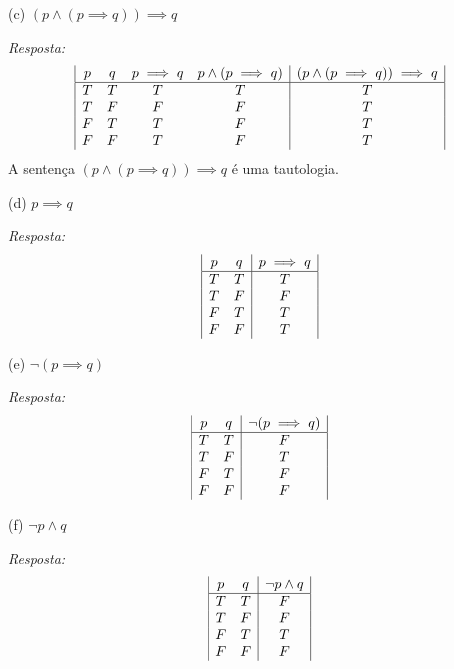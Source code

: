 \documentclass{article}
\begin{document}
(c) $(p \land (p \implies q)) \implies q$

\textit{Resposta:}
\begin{displaymath}
\begin{array}{|c c c c|c|}
p & q & p \implies q & p \land (p \implies q) & (p \land (p \implies q)) \implies q\\
\hline
T & T & T & T & T\\
T & F & F & F & T\\
F & T & T & F & T\\
F & F & T & F & T\\
\end{array}
\end{displaymath}
A sentença $(p \land (p \implies q)) \implies q$ é uma tautologia.

(d) $p \implies q$

\textit{Resposta:}
\begin{displaymath}
\begin{array}{|c c|c|}
p & q & p \implies q\\
\hline
T & T & T\\
T & F & F\\
F & T & T\\
F & F & T\\
\end{array}
\end{displaymath}

(e) $\neg (p \implies q)$

\textit{Resposta:}
\begin{displaymath}
\begin{array}{|c c|c|}
p & q & \neg (p \implies q)\\
\hline
T & T & F\\
T & F & T\\
F & T & F\\
F & F & F\\
\end{array}
\end{displaymath}

(f) $\neg p \land q$

\textit{Resposta:}
\begin{displaymath}
\begin{array}{|c c|c|}
p & q & \neg p \land q\\
\hline
T & T & F\\
T & F & F\\
F & T & T\\ F & F & F\\ \end{array} \end{displaymath}
\end{document}
